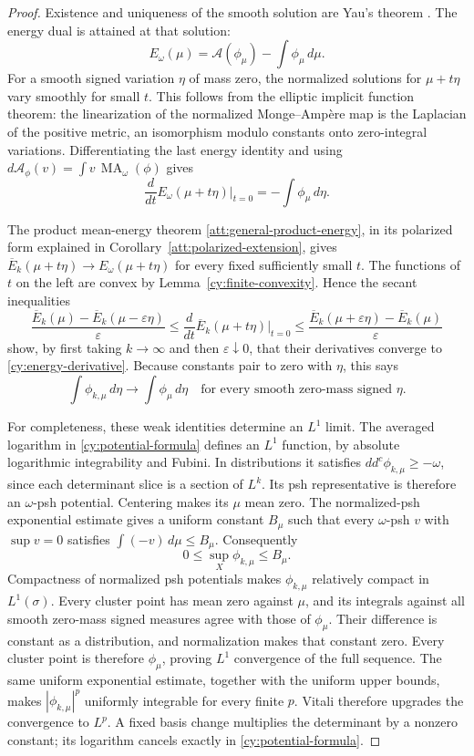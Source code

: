 \begin{proof}
Existence and uniqueness of the smooth solution are Yau's theorem
\cite{Yau1978}. The energy dual is attained at that solution:
\[
 E_\omega(\mu)=\mathcal A(\phi_\mu)-\int\phi_\mu\,d\mu.
\]
For a smooth signed variation $\eta$ of mass zero, the normalized
solutions for $\mu+t\eta$ vary smoothly for small $t$. This follows
from the elliptic implicit function theorem: the linearization of the
normalized Monge--Amp\`ere map is the Laplacian of the positive metric,
an isomorphism modulo constants onto zero-integral variations.
Differentiating the last energy identity and using
$d\mathcal A_\phi(v)=\int v\,\operatorname{MA}_\omega(\phi)$ gives
\begin{equation}
 \frac{d}{dt}E_\omega(\mu+t\eta)\bigg|_{t=0}
                 =-\int\phi_\mu\,d\eta.
 \label{cy:energy-derivative}
\end{equation}

The product mean-energy theorem
\ref{att:general-product-energy}, in its polarized form explained in
Corollary~\ref{att:polarized-extension}, gives
$\overline E_k(\mu+t\eta)\to E_\omega(\mu+t\eta)$ for every
fixed sufficiently small $t$. The functions of $t$ on the left are
convex by Lemma~\ref{cy:finite-convexity}. Hence the secant inequalities
\[
 \frac{\overline E_k(\mu)-\overline E_k(\mu-\varepsilon\eta)}\varepsilon
 \le \frac{d}{dt}\overline E_k(\mu+t\eta)\bigg|_{t=0}
 \le
 \frac{\overline E_k(\mu+\varepsilon\eta)-\overline E_k(\mu)}\varepsilon
\]
show, by first taking $k\to\infty$ and then $\varepsilon\downarrow0$,
that their derivatives converge to \eqref{cy:energy-derivative}.
Because constants pair to zero with $\eta$, this says
\[
 \int\phi_{k,\mu}\,d\eta\longrightarrow\int\phi_\mu\,d\eta
 \quad\text{for every smooth zero-mass signed }\eta.
\]

For completeness, these weak identities determine an $L^1$ limit.
The averaged logarithm in \eqref{cy:potential-formula} defines an
$L^1$ function, by absolute logarithmic integrability and Fubini.
In distributions it satisfies
$dd^c\phi_{k,\mu}\ge-\omega$, since each determinant slice is a
section of $L^k$. Its psh representative is therefore an
$\omega$-psh potential. Centering makes its $\mu$ mean zero.
The normalized-psh exponential estimate gives a uniform constant $B_\mu$
such that every $\omega$-psh $v$ with $\sup v=0$ satisfies
$\int(-v)\,d\mu\le B_\mu$. Consequently
\[
 0\le\sup_X\phi_{k,\mu}\le B_\mu.
\]
Compactness of normalized psh potentials makes $\phi_{k,\mu}$ relatively
compact in $L^1(\sigma)$. Every cluster point has mean zero against
$\mu$, and its integrals against all smooth zero-mass signed measures
agree with those of $\phi_\mu$. Their difference is constant as a
distribution, and normalization makes that constant zero. Every cluster
point is therefore $\phi_\mu$, proving $L^1$ convergence of the full
sequence. The same uniform exponential estimate, together with the
uniform upper bounds, makes $|\phi_{k,\mu}|^p$ uniformly integrable
for every finite $p$. Vitali therefore upgrades the convergence to
$L^p$. A fixed basis change multiplies the determinant by a nonzero constant;
its logarithm cancels exactly in \eqref{cy:potential-formula}.
\end{proof}

